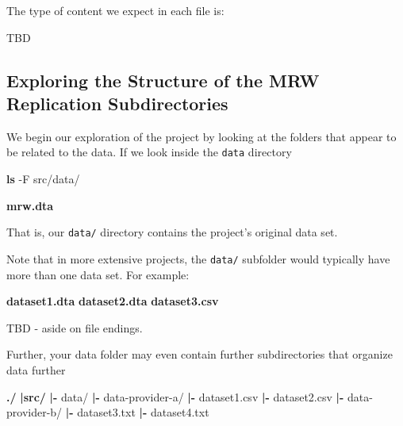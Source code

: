 \documentclass[]{book}
\newenvironment{Shaded}{\begin{snugshade}}{\end{snugshade}}
\newcommand{\KeywordTok}[1]{\textcolor[rgb]{0.13,0.29,0.53}{\textbf{{#1}}}}
\newcommand{\NormalTok}[1]{{#1}}
\theoremstyle{definition}
\theoremstyle{definition}
\theoremstyle{definition}
\theoremstyle{remark}
\begin{document}
The type of content we expect in each file is:

TBD

\subsection{Exploring the Structure of the MRW Replication
Subdirectories}\label{exploring-the-structure-of-the-mrw-replication-subdirectories}

We begin our exploration of the project by looking at the folders that
appear to be related to the data. If we look inside the \texttt{data}
directory

\begin{Shaded}
\begin{Highlighting}[]
\KeywordTok{ls} \NormalTok{-F src/data/}
\end{Highlighting}
\end{Shaded}

\begin{Shaded}
\begin{Highlighting}[]
\KeywordTok{mrw.dta}
\end{Highlighting}
\end{Shaded}

That is, our \texttt{data/} directory contains the project's original
data set.

Note that in more extensive projects, the \texttt{data/} subfolder would
typically have more than one data set. For example:

\begin{Shaded}
\begin{Highlighting}[]
\KeywordTok{dataset1.dta}
\KeywordTok{dataset2.dta}
\KeywordTok{dataset3.csv}
\end{Highlighting}
\end{Shaded}

TBD - aside on file endings.

Further, your data folder may even contain further subdirectories that
organize data further

\begin{Shaded}
\begin{Highlighting}[]
\KeywordTok{./}
    \KeywordTok{|src/}
        \KeywordTok{|-} \NormalTok{data/}
            \KeywordTok{|-} \NormalTok{data-provider-a/}
                \KeywordTok{|-} \NormalTok{dataset1.csv}
                \KeywordTok{|-} \NormalTok{dataset2.csv}
            \KeywordTok{|-} \NormalTok{data-provider-b/}
                \KeywordTok{|-} \NormalTok{dataset3.txt}
                \KeywordTok{|-} \NormalTok{dataset4.txt}
\end{Highlighting}
\end{Shaded}
\end{document}
